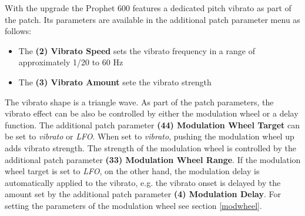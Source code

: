 With the upgrade the Prophet 600 features a dedicated pitch vibrato as part of the patch. Its parameters are available in the additional patch parameter menu as follows:

\begin{itemize}
  \item The \textbf{(2) Vibrato Speed} sets the vibrato frequency in a range of approximately 1/20 to 60 Hz
  \item The \textbf{(3) Vibrato Amount} sete the vibrato strength
\end{itemize}

The vibrato shape is a triangle wave. As part of the patch parameters, the vibrato effect can be also be controlled by either the modulation wheel or a delay function. The additional patch parameter \textbf{(44) Modulation Wheel Target} can be set to \textit{vibrato} or \textit{LFO}. When set to \textit{vibrato}, pushing the modulation wheel up adds vibrato strength. The strength of the modulation wheel is controlled by the additional patch parameter \textbf{(33) Modulation Wheel Range}. If the modulation wheel target is set to \textit{LFO}, on the other hand, the modulation delay is automatically applied to the vibrato, e.g. the vibrato onset is delayed by the amount set by the additional patch parameter \textbf{(4) Modulation Delay}. For setting the parameters of the modulation wheel see section \ref{modwheel}.
